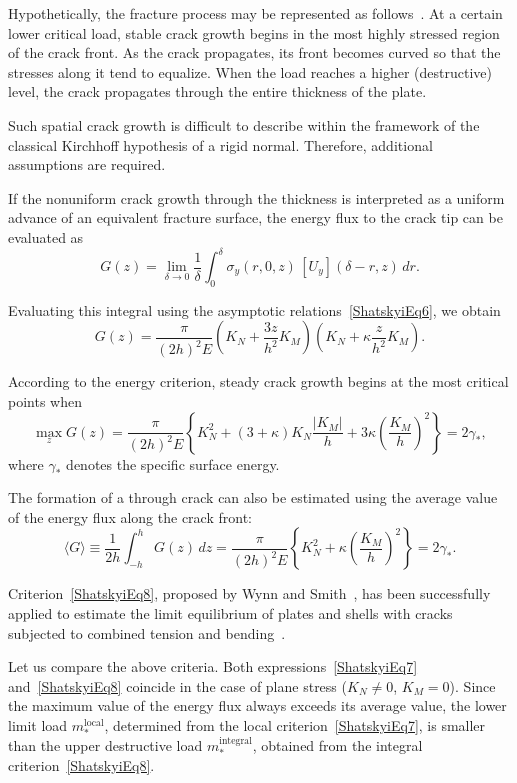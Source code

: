 Hypothetically, the fracture process may be represented as follows~\cite{Shatskyi22}. At a certain lower critical load, stable crack growth begins in the most highly stressed region of the crack front. As the crack propagates, its front becomes curved so that the stresses along it tend to equalize. When the load reaches a higher (destructive) level, the crack propagates through the entire thickness of the plate.

Such spatial crack growth is difficult to describe within the framework of the classical Kirchhoff hypothesis of a rigid normal. Therefore, additional assumptions are required.

If the nonuniform crack growth through the thickness is interpreted as a uniform advance of an equivalent fracture surface, the energy flux to the crack tip can be evaluated as
\[
G(z) = \lim_{\delta\to0}
\frac{1}{\delta}
\int_{0}^{\delta}
\sigma_y(r,0,z)\,[U_y](\delta-r,z)\,dr .
\]

Evaluating this integral using the asymptotic relations~\eqref{ShatskyiEq6}, we obtain
\[
G(z)=
\frac{\pi}{(2h)^2E}
\left(
K_N+\frac{3z}{h^2}K_M
\right)
\left(
K_N+\kappa\frac{z}{h^2}K_M
\right).
\]

According to the energy criterion, steady crack growth begins at the most critical points when
\begin{equation}
	\max_{z} G(z)
	=
	\frac{\pi}{(2h)^2E}
	\left\{
	K_N^2
	+
	(3+\kappa)K_N\frac{|K_M|}{h}
	+
	3\kappa\left(\frac{K_M}{h}\right)^2
	\right\}
	=
	2\gamma_* ,
	\label{ShatskyiEq7}
\end{equation}
where $\gamma_*$ denotes the specific surface energy.

The formation of a through crack can also be estimated using the average value of the energy flux along the crack front:
\begin{equation}
	\langle G \rangle
	\equiv
	\frac{1}{2h}
	\int_{-h}^{h} G(z)\,dz
	=
	\frac{\pi}{(2h)^2E}
	\left\{
	K_N^2
	+
	\kappa\left(\frac{K_M}{h}\right)^2
	\right\}
	=
	2\gamma_* .
	\label{ShatskyiEq8}
\end{equation}

Criterion~\eqref{ShatskyiEq8}, proposed by Wynn and Smith~\cite{Shatskyi23}, has been successfully applied to estimate the limit equilibrium of plates and shells with cracks subjected to combined tension and bending~\cite{Shatskyi24,Shatskyi25,Shatskyi26,Shatskyi27,Shatskyi28,Shatskyi29,Shatskyi30}.

Let us compare the above criteria. Both expressions~\eqref{ShatskyiEq7} and~\eqref{ShatskyiEq8} coincide in the case of plane stress ($K_N\neq0$, $K_M=0$). Since the maximum value of the energy flux always exceeds its average value, the lower limit load $m_*^{\text{local}}$, determined from the local criterion~\eqref{ShatskyiEq7}, is smaller than the upper destructive load $m_*^{\text{integral}}$, obtained from the integral criterion~\eqref{ShatskyiEq8}.

